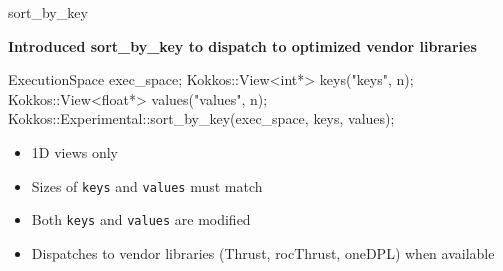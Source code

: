 

\begin{frame}[fragile]{sort\_by\_key}

\textbf{Introduced sort\_by\_key to dispatch to optimized vendor libraries}

\vspace{10pt}

\begin{code}
  ExecutionSpace exec_space;
  Kokkos::View<int*> keys("keys", n);
  Kokkos::View<float*> values("values", n);
  Kokkos::Experimental::sort_by_key(exec_space, keys, values);
\end{code}

\vspace{10pt}

\begin{itemize}
  \item 1D views only
  \item Sizes of \texttt{keys} and \texttt{values} must match
  \item Both \texttt{keys} and \texttt{values} are modified
  \item Dispatches to vendor libraries (Thrust, rocThrust, oneDPL) when available
\end{itemize}

\end{frame}


